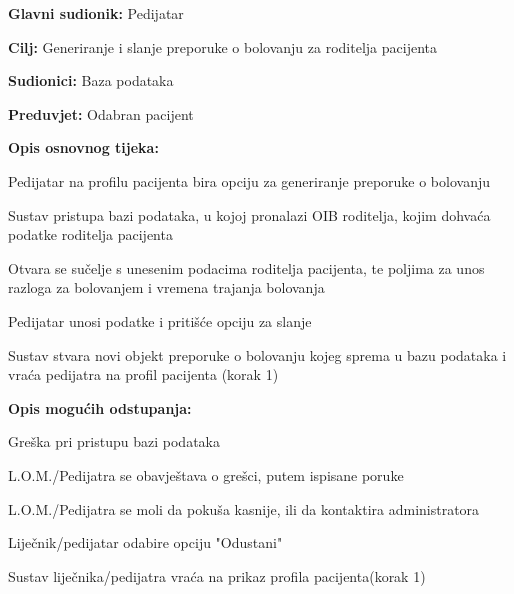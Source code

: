 					\noindent {}
					\begin{packed_item}
						
						\item \textbf{Glavni sudionik: }Pedijatar
						\item  \textbf{Cilj:} Generiranje i slanje preporuke o bolovanju za roditelja pacijenta
						\item  \textbf{Sudionici:} Baza podataka
						\item  \textbf{Preduvjet:} Odabran pacijent
						\item  \textbf{Opis osnovnog tijeka:}
						
						\item[] \begin{packed_enum}
							
							\item Pedijatar na profilu pacijenta bira opciju za generiranje preporuke o bolovanju
							\item Sustav pristupa bazi podataka, u kojoj pronalazi OIB roditelja, kojim dohvaća podatke roditelja pacijenta
							\item Otvara se sučelje s unesenim podacima roditelja pacijenta, te poljima za unos razloga za bolovanjem i vremena trajanja bolovanja
							\item Pedijatar unosi podatke i pritišće opciju za slanje
							\item Sustav stvara novi objekt preporuke o bolovanju kojeg sprema u bazu podataka i vraća pedijatra na profil pacijenta (korak 1)
						\end{packed_enum}
						\item \textbf{Opis mogućih odstupanja:}
						\item[] \begin{packed_item}
							\item[2/5.a] Greška pri pristupu bazi podataka
							\item[] \begin{packed_enum}
								
								\item L.O.M./Pedijatra se obavještava o grešci, putem ispisane poruke
								\item L.O.M./Pedijatra se moli da pokuša kasnije, ili da kontaktira administratora
								
							\end{packed_enum}
								\item[4.a] Liječnik/pedijatar odabire opciju "Odustani"
								\item[] \begin{packed_enum}
									\item Sustav liječnika/pedijatra vraća na prikaz profila pacijenta(korak 1)
								\end{packed_enum}
						\end{packed_item}
					\end{packed_item}
					
